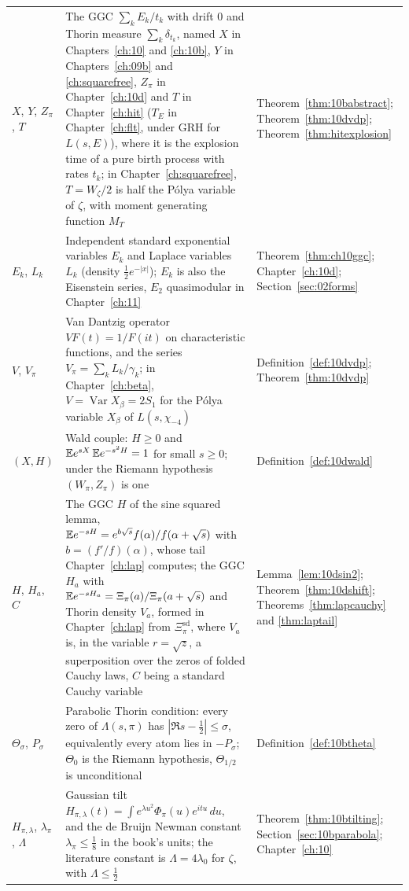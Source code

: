 {\begin{longtable}{p{0.8in}p{2.65in}p{0.95in}}
\raggedright $X$, $Y$, $Z_\pi$, $T$ & \raggedright The GGC $\sum_kE_k/t_k$ with drift $0$ and Thorin measure $\sum_k\delta_{t_k}$, named $X$ in Chapters~\ref{ch:10} and \ref{ch:10b}, $Y$ in Chapters~\ref{ch:09b} and \ref{ch:squarefree}, $Z_\pi$ in Chapter~\ref{ch:10d} and $T$ in Chapter~\ref{ch:hit} ($T_E$ in Chapter~\ref{ch:flt}, under GRH for $L(s,E)$), where it is the explosion time of a pure birth process with rates $t_k$; in Chapter~\ref{ch:squarefree}, $T=W_\zeta/2$ is half the P\'olya variable of $\zeta$, with moment generating function $M_T$ & \raggedright Theorem~\ref{thm:10babstract}; Theorem~\ref{thm:10dvdp}; Theorem~\ref{thm:hitexplosion}\tabularnewline[1pt]
\raggedright $E_k$, $L_k$ & \raggedright Independent standard exponential variables $E_k$ and Laplace variables $L_k$ (density $\frac12e^{-|x|}$); $E_k$ is also the Eisenstein series, $E_2$ quasimodular in Chapter~\ref{ch:11} & \raggedright Theorem~\ref{thm:ch10ggc}; Chapter~\ref{ch:10d}; Section~\ref{sec:02forms}\tabularnewline[1pt]
\raggedright $V$, $V_\pi$ & \raggedright Van Dantzig operator $VF(t)=1/F(it)$ on characteristic functions, and the series $V_\pi=\sum_kL_k/\gamma_k$; in Chapter~\ref{ch:beta}, $V=\operatorname{Var}X_\beta=2S_1$ for the P\'olya variable $X_\beta$ of $L(s,\chi_{-4})$ & \raggedright Definition~\ref{def:10dvdp}; Theorem~\ref{thm:10dvdp}\tabularnewline[1pt]
\raggedright $(X,H)$ & \raggedright Wald couple: $H\ge0$ and $\mathbb{E} e^{sX}\,\mathbb{E} e^{-s^2H}=1$ for small $s\ge0$; under the Riemann hypothesis $(W_\pi,Z_\pi)$ is one & \raggedright Definition~\ref{def:10dwald}\tabularnewline[1pt]
\raggedright $H$, $H_a$, $C$ & \raggedright The GGC $H$ of the sine squared lemma, $\mathbb{E} e^{-sH}=e^{b\sqrt s}f(\alpha)/f(\alpha+\sqrt s)$ with $b=(f'/f)(\alpha)$, whose tail Chapter~\ref{ch:lap} computes; the GGC $H_a$ with $\mathbb{E} e^{-sH_a}=\Xi_\pi(a)/\Xi_\pi(a+\sqrt s)$ and Thorin density $V_a$, formed in Chapter~\ref{ch:lap} from $\Xi^{\mathrm{sd}}_\pi$, where $V_a$ is, in the variable $r=\sqrt z$, a superposition over the zeros of folded Cauchy laws, $C$ being a standard Cauchy variable & \raggedright Lemma~\ref{lem:10dsin2}; Theorem~\ref{thm:10dshift}; Theorems~\ref{thm:lapcauchy} and \ref{thm:laptail}\tabularnewline[1pt]
\raggedright $\Theta_\sigma$, $P_\sigma$ & \raggedright Parabolic Thorin condition: every zero of $\Lambda(s,\pi)$ has $|\Re s-\frac12|\le\sigma$, equivalently every atom lies in $-P_\sigma$; $\Theta_0$ is the Riemann hypothesis, $\Theta_{1/2}$ is unconditional & \raggedright Definition~\ref{def:10btheta}\tabularnewline[1pt]
\raggedright $H_{\pi,\lambda}$, $\lambda_\pi$, $\Lambda$ & \raggedright Gaussian tilt $H_{\pi,\lambda}(t)=\int e^{\lambda u^2}\Phi_\pi(u)e^{itu}\,du$, and the de Bruijn Newman constant $\lambda_\pi\le\frac18$ in the book's units; the literature constant is $\Lambda=4\lambda_0$ for $\zeta$, with $\Lambda\le\frac12$ & \raggedright Theorem~\ref{thm:10btilting}; Section~\ref{sec:10bparabola}; Chapter~\ref{ch:10}\tabularnewline[1pt]

\end{longtable}}
